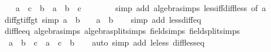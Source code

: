 \begin{isabellebody}
\ \ \isamarkupfalse%
\ {\isachardoublequoteopen}{\isacharparenleft}{\kern0pt}a\ {\isacharless}{\kern0pt}\ c\ {\isacharminus}{\kern0pt}\ b{\isacharparenright}{\kern0pt}\ {\isacharequal}{\kern0pt}\ {\isacharparenleft}{\kern0pt}a\ {\isacharplus}{\kern0pt}\ b\ {\isacharminus}{\kern0pt}\ c\ {\isacharless}{\kern0pt}\ {}{\isacharparenright}{\kern0pt}{\isachardoublequoteclose}\isanewline
\ \ \ \ \isamarkupfalse%
\ {\isacharparenleft}{\kern0pt}simp\ add{\isacharcolon}{\kern0pt}\ algebra{\isacharunderscore}{\kern0pt}simps\ less{\isacharunderscore}{\kern0pt}iff{\isacharunderscore}{\kern0pt}diff{\isacharunderscore}{\kern0pt}less{\isacharunderscore}{\kern0pt}{}\ {\isacharbrackleft}{\kern0pt}of\ a{\isacharbrackright}{\kern0pt}{\isacharparenright}{\kern0pt}\isanewline
{}\isamarkupfalse%
%
\endisatagproof
{\isafoldproof}%
%
\isadelimproof
\isanewline
%
\endisadelimproof
\isanewline
{}\isamarkupfalse%
\ diff{\isacharunderscore}{\kern0pt}gt{\isacharunderscore}{\kern0pt}{}{\isacharunderscore}{\kern0pt}iff{\isacharunderscore}{\kern0pt}gt\ {\isacharbrackleft}{\kern0pt}simp{\isacharbrackright}{\kern0pt}{\isacharcolon}{\kern0pt}\ {\isachardoublequoteopen}a\ {\isacharminus}{\kern0pt}\ b\ {\isachargreater}{\kern0pt}\ {}\ {\isasymlongleftrightarrow}\ a\ {\isachargreater}{\kern0pt}\ b{\isachardoublequoteclose}\isanewline
%
\isadelimproof
\ \ %
\endisadelimproof
%
\isatagproof
{}\isamarkupfalse%
\ {\isacharparenleft}{\kern0pt}simp\ add{\isacharcolon}{\kern0pt}\ less{\isacharunderscore}{\kern0pt}diff{\isacharunderscore}{\kern0pt}eq{\isacharparenright}{\kern0pt}%
\endisatagproof
{\isafoldproof}%
%
\isadelimproof
\isanewline
%
\endisadelimproof
\isanewline
{}\isamarkupfalse%
\ diff{\isacharunderscore}{\kern0pt}le{\isacharunderscore}{\kern0pt}eq\ {\isacharbrackleft}{\kern0pt}algebra{\isacharunderscore}{\kern0pt}simps{\isacharcomma}{\kern0pt}\ algebra{\isacharunderscore}{\kern0pt}split{\isacharunderscore}{\kern0pt}simps{\isacharcomma}{\kern0pt}\ field{\isacharunderscore}{\kern0pt}simps{\isacharcomma}{\kern0pt}\ field{\isacharunderscore}{\kern0pt}split{\isacharunderscore}{\kern0pt}simps{\isacharbrackright}{\kern0pt}{\isacharcolon}{\kern0pt}\isanewline
\ \ {\isachardoublequoteopen}a\ {\isacharminus}{\kern0pt}\ b\ {\isasymle}\ c\ {\isasymlongleftrightarrow}\ a\ {\isasymle}\ c\ {\isacharplus}{\kern0pt}\ b{\isachardoublequoteclose}\isanewline
%
\isadelimproof
\ \ %
\endisadelimproof
%
\isatagproof
{}\isamarkupfalse%
\ {\isacharparenleft}{\kern0pt}auto\ simp\ add{\isacharcolon}{\kern0pt}\ le{\isacharunderscore}{\kern0pt}less\ diff{\isacharunderscore}{\kern0pt}less{\isacharunderscore}{\kern0pt}eq\ {\isacharparenright}{\kern0pt}%

\end{isabellebody}
